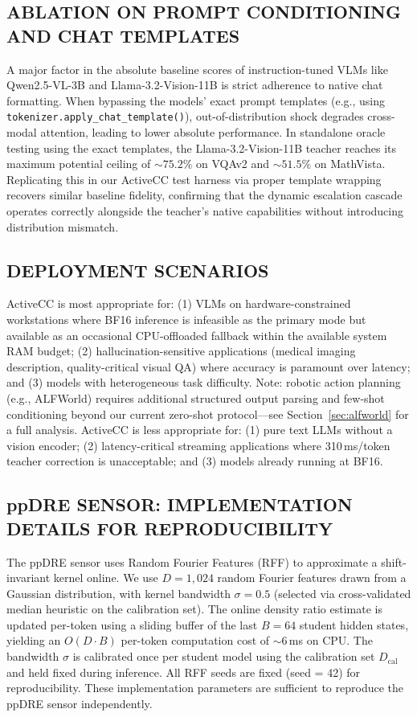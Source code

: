 \documentclass{ieeetmlcn}
\begin{document}
\subsection{ABLATION ON PROMPT CONDITIONING AND CHAT TEMPLATES}
A major factor in the absolute baseline scores of instruction-tuned VLMs like Qwen2.5-VL-3B and Llama-3.2-Vision-11B is strict adherence to native chat formatting. When bypassing the models' exact prompt templates (e.g., using \texttt{tokenizer.apply\_chat\_template()}), out-of-distribution shock degrades cross-modal attention, leading to lower absolute performance. 
In standalone oracle testing using the exact templates, the Llama-3.2-Vision-11B teacher reaches its maximum potential ceiling of $\sim\!75.2\%$ on VQAv2 and $\sim\!51.5\%$ on MathVista. Replicating this in our ActiveCC test harness via proper template wrapping recovers similar baseline fidelity, confirming that the dynamic escalation cascade operates correctly alongside the teacher's native capabilities without introducing distribution mismatch.


\subsection{DEPLOYMENT SCENARIOS}

ActiveCC is most appropriate for: (1) VLMs on hardware-constrained
workstations where BF16 inference is infeasible as the primary mode but
available as an occasional CPU-offloaded fallback within the available
system RAM budget; (2) hallucination-sensitive applications (medical
imaging description, quality-critical visual QA) where accuracy is
paramount over latency; and (3) models with heterogeneous task
difficulty. Note: robotic action planning (e.g., ALFWorld) requires
additional structured output parsing and few-shot conditioning beyond
our current zero-shot protocol---see Section~\ref{sec:alfworld} for a
full analysis. ActiveCC is less appropriate for: (1) pure text LLMs
without a vision encoder; (2) latency-critical streaming applications
where 310\,ms/token teacher correction is unacceptable; and (3) models
already running at BF16.

\subsection{ppDRE SENSOR: IMPLEMENTATION DETAILS FOR REPRODUCIBILITY}
The ppDRE sensor uses Random Fourier Features (RFF) \cite{rahimi2007random} to approximate a shift-invariant kernel online. We use $D = 1{,}024$ random Fourier features drawn from a Gaussian distribution, with kernel bandwidth $\sigma = 0.5$ (selected via cross-validated median heuristic on the calibration set). The online density ratio estimate is updated per-token using a sliding buffer of the last $B = 64$ student hidden states, yielding an $O(D \cdot B)$ per-token computation cost of $\sim$6\,ms on CPU. The bandwidth $\sigma$ is calibrated once per student model using the calibration set $D_{\text{cal}}$ and held fixed during inference. All RFF seeds are fixed (seed = 42) for reproducibility. These implementation parameters are sufficient to reproduce the ppDRE sensor independently.
\end{document}
